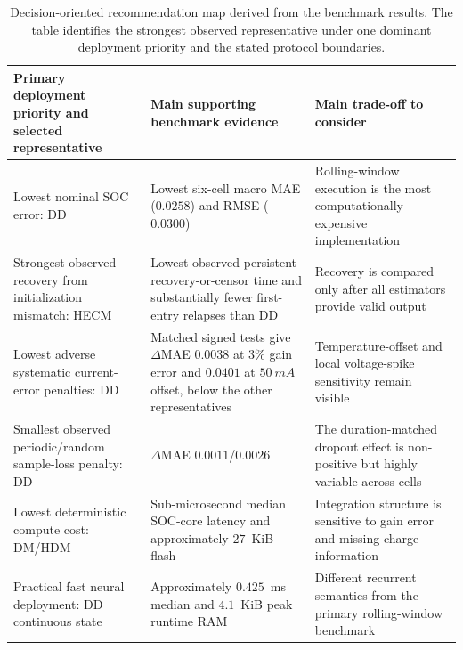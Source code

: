 \documentclass[review,nopreprintline]{elsarticle}
\begin{document}
\begin{table}[t]
    \centering
    \footnotesize
    \renewcommand{\arraystretch}{1.10}
    \setlength{\tabcolsep}{4pt}
    \caption{Decision-oriented recommendation map derived from the benchmark results. The table identifies the strongest observed representative under one dominant deployment priority and the stated protocol boundaries.}
    \label{tab:decision_guidance}
    \begin{tabularx}{\textwidth}{@{}>{\raggedright\arraybackslash}p{4.0cm}>{\raggedright\arraybackslash}X>{\raggedright\arraybackslash}X@{}}
        \toprule
        Primary deployment priority and selected representative & Main supporting benchmark evidence & Main trade-off to consider \\
        \midrule
        Lowest nominal SOC error: DD & Lowest six-cell macro MAE ($0.0258$) and RMSE ($0.0300$) & Rolling-window execution is the most computationally expensive implementation \\
        Strongest observed recovery from initialization mismatch: HECM & Lowest observed persistent-recovery-or-censor time and substantially fewer first-entry relapses than DD & Recovery is compared only after all estimators provide valid output \\
        Lowest adverse systematic current-error penalties: DD & Matched signed tests give $\Delta$MAE $0.0038$ at $3\%$ gain error and $0.0401$ at $\SI{50}{mA}$ offset, below the other representatives & Temperature-offset and local voltage-spike sensitivity remain visible \\
        Smallest observed periodic/random sample-loss penalty: DD & $\Delta$MAE $0.0011$/$0.0026$ & The duration-matched dropout effect is non-positive but highly variable across cells \\
        Lowest deterministic compute cost: DM/HDM & Sub-microsecond median SOC-core latency and approximately $27$~KiB flash & Integration structure is sensitive to gain error and missing charge information \\
        Practical fast neural deployment: DD continuous state & Approximately $0.425$~ms median and $4.1$~KiB peak runtime RAM & Different recurrent semantics from the primary rolling-window benchmark \\
        \bottomrule
    \end{tabularx}
\end{table}
\end{document}
